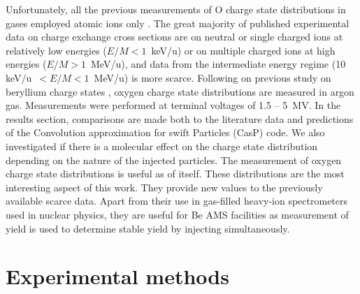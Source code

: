\documentclass[a4paper,fleqn,review]{cas-sc}
\begin{document}
Unfortunately, all the previous measurements of O charge state distributions in gases employed atomic ions only \cite{Hubbard1955,preikschat1966charge,Liu2014}. The great majority of published experimental data on charge exchange cross sections are on neutral or single charged ions at relatively low energies ($E/M< 1$~keV/u) or on multiple charged ions at high energies ($E/M> 1$~MeV/u), and data from the intermediate energy regime (10 keV/u~$<E/M<1$~MeV/u) is more scarce. 
Following on previous study on beryllium charge states \cite{gonsalves2020charge}, oxygen charge state distributions are measured in argon gas. Measurements were performed at terminal voltages of 1.5 – 5~MV. In the results section, comparisons are made both to the literature data and predictions of the Convolution approximation for swift Particles (CasP) code. We also investigated if there is a molecular effect on the charge state distribution depending on the nature of the injected particles.
The measurement of oxygen charge state distributions is useful as of itself. These distributions are the most interesting aspect of this work. They provide new values to the previously available scarce data. Apart from their use in gas-filled heavy-ion spectrometers used in nuclear physics, they are useful for Be AMS facilities as measurement of  yield is used to determine stable  yield by injecting  simultaneously.  


\section{Experimental methods}
\end{document}
